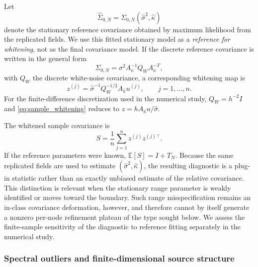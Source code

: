 \documentclass[11pt]{article}
\numberwithin{table}{section}
\numberwithin{figure}{section}
\begin{document}
Let
\begin{equation}
    \widehat\Sigma_{0,N}
    =
    \Sigma_{0,N}(\widehat\sigma^2,\widehat\kappa)
\end{equation}
denote the stationary reference covariance obtained by maximum likelihood from the replicated fields. We use this fitted stationary model as a \emph{reference for whitening}, not as the final covariance model. If the discrete reference covariance is written in the general form
\begin{equation}
    \Sigma_{0,N}
    =
    \sigma^2 A_\kappa^{-1}Q_W A_\kappa^{-T},
\end{equation}
with $Q_W$ the discrete white-noise covariance, a corresponding whitening map is
\begin{equation}
    z^{(j)}
    =
    \widehat\sigma^{-1}
    Q_W^{-1/2}
    A_{\widehat\kappa}u^{(j)},
    \qquad
    j=1,\ldots,n.
    \label{eq:sample_whitening}
\end{equation}
For the finite-difference discretization used in the numerical study, $Q_W=h^{-2}I$ and \eqref{eq:sample_whitening} reduces to $z=hA_{\widehat\kappa}u/\widehat\sigma$.

The whitened sample covariance is
\begin{equation}
    S
    =
    \frac1n
    \sum_{j=1}^{n}
    z^{(j)}z^{(j)\top}.
    \label{eq:whitened_sample_cov}
\end{equation}
If the reference parameters were known, $\mathbb E[S]=I+T_N$. Because the same replicated fields are used to estimate $(\widehat\sigma^2,\widehat\kappa)$, the resulting diagnostic is a plug-in statistic rather than an exactly unbiased estimate of the relative covariance. This distinction is relevant when the stationary range parameter is weakly identified or moves toward the boundary. Such range misspecification remains an in-class covariance deformation, however, and therefore cannot by itself generate a nonzero per-node refinement plateau of the type sought below. We assess the finite-sample sensitivity of the diagnostic to reference fitting separately in the numerical study.

\subsubsection{Spectral outliers and finite-dimensional source structure}
\label{sec:spectral_diag}
\end{document}
